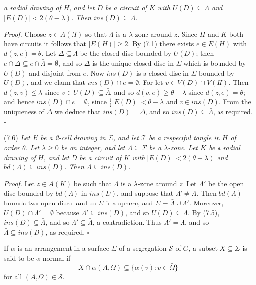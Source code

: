 \noindent \textit{a radial drawing of $H$, and let $D$ be a circuit of $K$ with $U(D) \subseteq \bar{\Lambda}$ and $|E(D)| < 2(\theta - \lambda)$. Then $ins(D) \subseteq \bar{\Lambda}$.}

\textit{Proof.} Choose $z \in A(H)$ so that $\Lambda$ is a $\lambda$-zone around $z$. Since $H$ and $K$ both have circuits it follows that $|E(H)| \ge 2$. By (7.1) there exists $e \in E(H)$ with $d(z, e) = \theta$. Let $\Delta \subseteq \bar{\Lambda}$ be the closed disc bounded by $U(D)$; then $e \cap \Delta \subseteq e \cap \bar{\Lambda} = \emptyset$, and so $\Delta$ is the unique closed disc in $\Sigma$ which is bounded by $U(D)$ and disjoint from $e$. Now $ins(D)$ is a closed disc in $\Sigma$ bounded by $U(D)$, and we claim that $ins(D) \cap e = \emptyset$. For let $v \in V(D) \cap V(H)$. Then $d(z, v) \le \lambda$ since $v \in U(D) \subseteq \bar{\Lambda}$, and so $d(v, e) \ge \theta - \lambda$ since $d(z, e) = \theta$; and hence $ins(D) \cap e = \emptyset$, since $\frac{1}{2}|E(D)| < \theta - \lambda$ and $v \in ins(D)$. From the uniqueness of $\Delta$ we deduce that $ins(D) = \Delta$, and so $ins(D) \subseteq \bar{\Lambda}$, as required. $\square$

\stmt
(7.6) \textit{Let $H$ be a 2-cell drawing in $\Sigma$, and let $\mathscr{T}$ be a respectful tangle in $H$ of order $\theta$. Let $\lambda \ge 0$ be an integer, and let $\Lambda \subseteq \Sigma$ be a $\lambda$-zone. Let $K$ be a radial drawing of $H$, and let $D$ be a circuit of $K$ with $|E(D)| < 2(\theta - \lambda)$ and $bd(\Lambda) \subseteq ins(D)$. Then $\bar{\Lambda} \subseteq ins(D)$.}

\textit{Proof.} Let $z \in A(K)$ be such that $\Lambda$ is a $\lambda$-zone around $z$. Let $\Lambda'$ be the open disc bounded by $bd(\Lambda)$ in $ins(D)$, and suppose that $\Lambda' \ne \Lambda$. Then $bd(\Lambda)$ bounds two open discs, and so $\Sigma$ is a sphere, and $\Sigma = \bar{\Lambda} \cup \Lambda'$. Moreover, $U(D) \cap \Lambda' = \emptyset$ because $\Lambda' \subseteq ins(D)$, and so $U(D) \subseteq \bar{\Lambda}$. By (7.5), $ins(D) \subseteq \bar{\Lambda}$, and so $\Lambda' \subseteq \bar{\Lambda}$, a contradiction. Thus $\Lambda' = \Lambda$, and so $\bar{\Lambda} \subseteq ins(D)$, as required. $\square$

If $\alpha$ is an arrangement in a surface $\Sigma$ of a segregation $\mathscr{S}$ of $G$, a subset $X \subseteq \Sigma$ is said to be $\alpha$-normal if
\begin{equation*}
X \cap \alpha(A, \Omega) \subseteq \{\alpha(v) : v \in \bar{\Omega}\}
\end{equation*}
for all $(A, \Omega) \in \mathscr{S}$.

